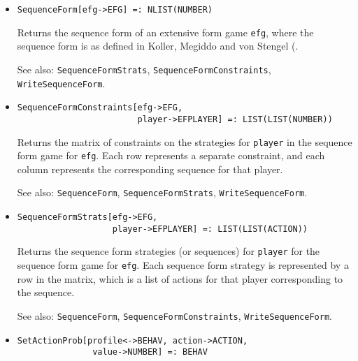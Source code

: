\begin{itemize}

\item{}
\protect \large \begin{verbatim} 
SequenceForm[efg->EFG] =: NLIST(NUMBER)
\end{verbatim}\normalsize

\bd
Returns the sequence form of an extensive form game 
\verb+efg+, where the sequence form is as defined in Koller,
Megiddo and von Stengel (\cite{KolMegSte:94}.
\item [See also:] \verb+SequenceFormStrats+,
\verb+SequenceFormConstraints+, \verb+WriteSequenceForm+.
\ed

\item{}
\protect \large \begin{verbatim} 
SequenceFormConstraints[efg->EFG, 
                        player->EFPLAYER] =: LIST(LIST(NUMBER))
\end{verbatim}\normalsize

\bd Returns the matrix of constraints on the strategies for
\verb+player+ in the sequence form game for \verb+efg+.  Each row
represents a separate constraint, and each column represents the
corresponding sequence for that player.
\item [See also:] \verb+SequenceForm+,
\verb+SequenceFormStrats+, \verb+WriteSequenceForm+.
\ed

\item{}
\protect \large \begin{verbatim} 
SequenceFormStrats[efg->EFG, 
                   player->EFPLAYER] =: LIST(LIST(ACTION))
\end{verbatim}\normalsize

\bd 
Returns the sequence form strategies (or sequences) for
\verb+player+ for the sequence form game for \verb+efg+. Each
sequence form strategy is represented by a row in the matrix, which is
a list of actions for that player corresponding to the sequence.  
\item [See also:] \verb+SequenceForm+,
\verb+SequenceFormConstraints+, \verb+WriteSequenceForm+.
\ed

\item{}
\protect \large \begin{verbatim} 
SetActionProb[profile<->BEHAV, action->ACTION, 
               value->NUMBER] =: BEHAV 
\end{verbatim}\normalsize


\end{itemize}
